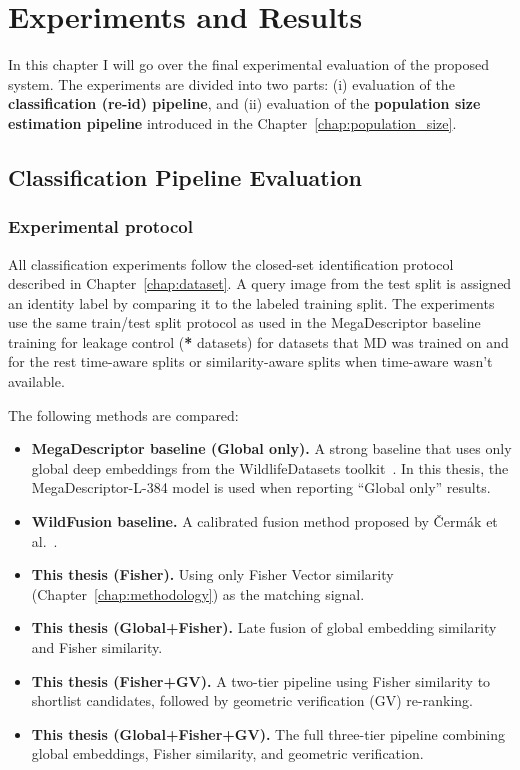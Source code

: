 \chapter{Experiments and Results}
\label{chap:results}

In this chapter I will go over the final experimental evaluation of the proposed system. The experiments are divided into two parts:
(i) evaluation of the \textbf{classification (re-id) pipeline}, and
(ii) evaluation of the \textbf{population size estimation pipeline} introduced in the Chapter~\ref{chap:population_size}.

\section{Classification Pipeline Evaluation}
\label{sec:results_class}

\subsection{Experimental protocol}
All classification experiments follow the closed-set identification protocol described in 
Chapter~\ref{chap:dataset}. A query image from the test split is assigned an identity label by 
comparing it to the labeled training split. The experiments use the same 
train/test split protocol as used in the MegaDescriptor baseline training for leakage control (\textbf{*} datasets) for datasets that MD was trained on and for the rest time-aware splits or similarity-aware splits when time-aware wasn't available. 

The following methods are compared:
\begin{itemize}
    \item \textbf{MegaDescriptor baseline (Global only).} A strong baseline that uses only global 
    deep embeddings from the WildlifeDatasets toolkit~\cite{čermák2023wildlifedatasetsopensourcetoolkitanimal}. 
    In this thesis, the MegaDescriptor-L-384 model is used when reporting ``Global only'' results.
    \item \textbf{WildFusion baseline.} A calibrated fusion method proposed by 
    Čermák et al.~\cite{cermak2024wildfusionindividualanimalidentification}.
    \item \textbf{This thesis (Fisher).} Using only Fisher Vector similarity (Chapter~\ref{chap:methodology}) as
     the matching signal.
    \item \textbf{This thesis (Global+Fisher).} Late fusion of global embedding similarity and Fisher similarity.
    \item \textbf{This thesis (Fisher+GV).} A two-tier pipeline using Fisher similarity to shortlist candidates, 
    followed by geometric verification (GV) re-ranking.
    \item \textbf{This thesis (Global+Fisher+GV).} The full three-tier pipeline combining global embeddings, 
    Fisher similarity, and geometric verification.
\end{itemize}

